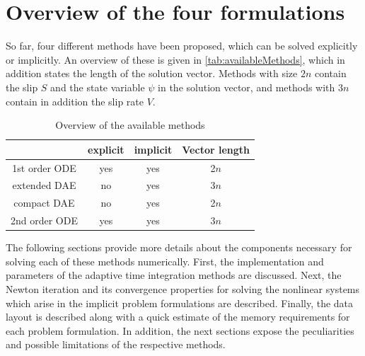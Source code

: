 \section{Overview of the four formulations}
\label{sec:44mul4SEAS__Aspects}

So far, four different methods have been proposed, which can be solved explicitly or implicitly. An overview of these is given in \autoref{tab:availableMethods}, which in addition states the length of the solution vector. Methods with size $2n$ contain the slip $S$ and the state variable $\psi$ in the solution vector, and methods with $3n$ contain in addition the slip rate $V$.
\begin{table}[H]
	\centering 
	\begin{tabular}{ | c | c c | c |}
		\hline	
						& explicit	& implicit 	& Vector length\\ \hline
		1st order ODE 	& yes 		& yes 		& 2$n$\\  
		extended DAE  	& no 		& yes 		& 3$n$\\
		compact DAE  	& no 		& yes 		& 2$n$\\
		2nd order ODE  	& yes 		& yes 		& 3$n$\\
		\hline
	\end{tabular}
	\caption{Overview of the available methods}
	\label{tab:availableMethods}
\end{table}

The following sections provide more details about the components necessary for solving each of these methods numerically. First, the implementation and parameters of the adaptive time integration methods are discussed. Next, the Newton iteration and its convergence properties for solving the nonlinear systems which arise in the implicit problem formulations are described. Finally, the data layout is described along with a quick estimate of the memory requirements for each problem formulation. In addition, the next sections expose the peculiarities and possible limitations of the respective methods.

